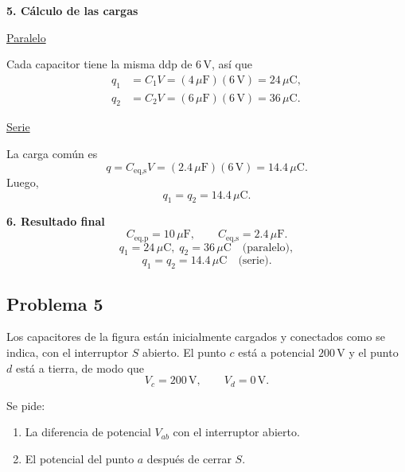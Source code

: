 \documentclass[11pt]{article}
\begin{document}
\textbf{5. C\'alculo de las cargas}

\underline{Paralelo}

Cada capacitor tiene la misma ddp de $6\,\text{V}$, as\'i que
\begin{align*}
    q_1&=C_1V=(4\,\mu\text{F})(6\,\text{V})=24\,\mu\text{C},\\
    q_2&=C_2V=(6\,\mu\text{F})(6\,\text{V})=36\,\mu\text{C}.
\end{align*}

\underline{Serie}

La carga com\'un es
\begin{equation*}
    q=C_{\text{eq,s}}V=(2.4\,\mu\text{F})(6\,\text{V})=14.4\,\mu\text{C}.
\end{equation*}
Luego,
\begin{equation*}
    q_1=q_2=14.4\,\mu\text{C}.
\end{equation*}

\textbf{6. Resultado final}
\begin{equation*}
    \boxed{C_{\text{eq,p}}=10\,\mu\text{F}},
    \qquad
    \boxed{C_{\text{eq,s}}=2.4\,\mu\text{F}}.
\end{equation*}
\begin{equation*}
    \boxed{q_1=24\,\mu\text{C},\; q_2=36\,\mu\text{C}\quad \text{(paralelo)}},
\end{equation*}
\begin{equation*}
    \boxed{q_1=q_2=14.4\,\mu\text{C}\quad \text{(serie)}}.
\end{equation*}

\newpage

\subsection*{Problema 5}
Los capacitores de la figura est\'an inicialmente cargados y conectados como se indica, con el interruptor $S$ abierto. El punto $c$ est\'a a potencial $200\,\text{V}$ y el punto $d$ est\'a a tierra, de modo que
\begin{equation*}
    V_c=200\,\text{V},
    \qquad
    V_d=0\,\text{V}.
\end{equation*}

Se pide:
\begin{enumerate}[label=(\alph*)]
    \item La diferencia de potencial $V_{ab}$ con el interruptor abierto.
    \item El potencial del punto $a$ despu\'es de cerrar $S$.
\end{enumerate}
\end{document}
